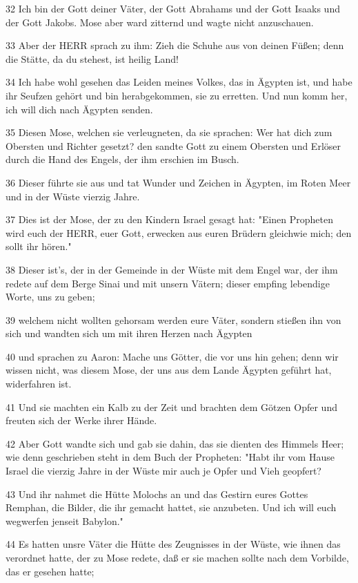 \par 32 Ich bin der Gott deiner Väter, der Gott Abrahams und der Gott Isaaks und der Gott Jakobs. Mose aber ward zitternd und wagte nicht anzuschauen.
\par 33 Aber der HERR sprach zu ihm: Zieh die Schuhe aus von deinen Füßen; denn die Stätte, da du stehest, ist heilig Land!
\par 34 Ich habe wohl gesehen das Leiden meines Volkes, das in Ägypten ist, und habe ihr Seufzen gehört und bin herabgekommen, sie zu erretten. Und nun komm her, ich will dich nach Ägypten senden.
\par 35 Diesen Mose, welchen sie verleugneten, da sie sprachen: Wer hat dich zum Obersten und Richter gesetzt? den sandte Gott zu einem Obersten und Erlöser durch die Hand des Engels, der ihm erschien im Busch.
\par 36 Dieser führte sie aus und tat Wunder und Zeichen in Ägypten, im Roten Meer und in der Wüste vierzig Jahre.
\par 37 Dies ist der Mose, der zu den Kindern Israel gesagt hat: "Einen Propheten wird euch der HERR, euer Gott, erwecken aus euren Brüdern gleichwie mich; den sollt ihr hören."
\par 38 Dieser ist's, der in der Gemeinde in der Wüste mit dem Engel war, der ihm redete auf dem Berge Sinai und mit unsern Vätern; dieser empfing lebendige Worte, uns zu geben;
\par 39 welchem nicht wollten gehorsam werden eure Väter, sondern stießen ihn von sich und wandten sich um mit ihren Herzen nach Ägypten
\par 40 und sprachen zu Aaron: Mache uns Götter, die vor uns hin gehen; denn wir wissen nicht, was diesem Mose, der uns aus dem Lande Ägypten geführt hat, widerfahren ist.
\par 41 Und sie machten ein Kalb zu der Zeit und brachten dem Götzen Opfer und freuten sich der Werke ihrer Hände.
\par 42 Aber Gott wandte sich und gab sie dahin, das sie dienten des Himmels Heer; wie denn geschrieben steht in dem Buch der Propheten: "Habt ihr vom Hause Israel die vierzig Jahre in der Wüste mir auch je Opfer und Vieh geopfert?
\par 43 Und ihr nahmet die Hütte Molochs an und das Gestirn eures Gottes Remphan, die Bilder, die ihr gemacht hattet, sie anzubeten. Und ich will euch wegwerfen jenseit Babylon."
\par 44 Es hatten unsre Väter die Hütte des Zeugnisses in der Wüste, wie ihnen das verordnet hatte, der zu Mose redete, daß er sie machen sollte nach dem Vorbilde, das er gesehen hatte;
